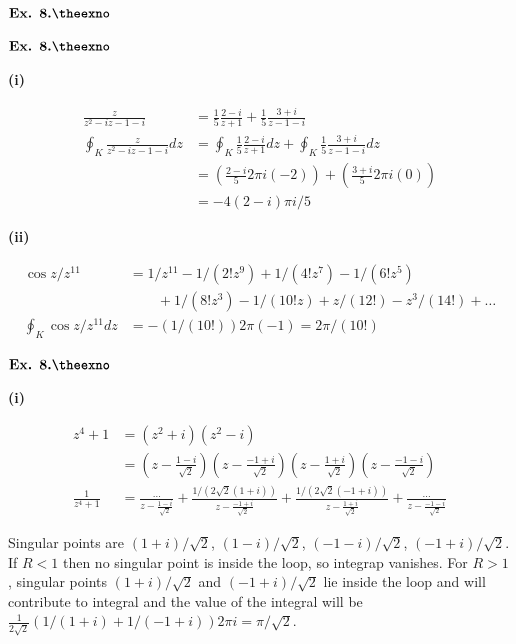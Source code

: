 \documentclass{article}
\def\tf{\textbf}
\newcounter{exno}
\begin{document}
${\textbf{Ex. 8.\theexno}}$\addtocounter{exno}{1}

\vspace{0.2in}

${\textbf{Ex. 8.\theexno}}$\addtocounter{exno}{1}
\tf{(i)} 

\begin{align*}
    \frac{z}{z^2-iz-1-i} &= \frac{1}{5}\frac{2-i}{z+1} + \frac{1}{5}\frac{3+i}{z-1-i}\\
    \oint_{K}\frac{z}{z^2-iz-1-i}dz &= \oint_{K}\frac{1}{5}\frac{2-i}{z+1}dz + \oint_{K}\frac{1}{5}\frac{3+i}{z-1-i}dz\\
    &= (\frac{2-i}{5} 2\pi i (-2)) + (\frac{3+i}{5}2\pi i  (0))\\
    &= -4(2-i)\pi i/5
\end{align*}

\tf{(ii)}

\begin{align*}
    \cos z/z^{11} &= 1/z^{11} - 1/(2!z^{9}) + 1/(4!z^{7}) - 1/(6!z^{5})\\
    &\qquad + 1/(8!z^{3}) - 1/(10!z) + z/(12!) - z^{3}/(14!) + \ldots\\
    \oint_{K}\cos z/z^{11}dz &= -(1/(10!))2\pi (-1) = 2\pi /(10!)
\end{align*}

\vspace{0.2in}

${\textbf{Ex. 8.\theexno}}$\addtocounter{exno}{1}

\tf{(i)}

\begin{align*}
    z^4+1 &= (z^2+i)(z^2-i)\\
    &= (z-\frac{1-i}{\sqrt{2}})(z-\frac{-1+i}{\sqrt{2}})(z-\frac{1+i}{\sqrt{2}})(z-\frac{-1-i}{\sqrt{2}})\\
    \frac{1}{z^4+1} &= \frac{\ldots}{z-\frac{1-i}{\sqrt{2}}} + \frac{1/(2\sqrt{2}(1+i))}{z-\frac{-1+i}{\sqrt{2}}} + \frac{1/(2\sqrt{2}(-1+i))}{z-\frac{1+i}{\sqrt{2}}} + \frac{\ldots}{z-\frac{-1-i}{\sqrt{2}}}
\end{align*}

Singular points are $(1+i)/\sqrt{2}$, $(1-i)/\sqrt{2}$, $(-1-i)/\sqrt{2}$, $(-1+i)/\sqrt{2}$. If $R < 1$ then no singular point is inside the loop, so integrap vanishes. For $R > 1$, singular points $(1+i)/\sqrt{2}$ and $(-1+i)/\sqrt{2}$ lie inside the loop and will contribute to integral and the value of the integral will be $\frac{1}{2\sqrt{2}}(1/(1+i)+1/(-1+i))2\pi i = \pi/\sqrt{2}$.\\~\\
\end{document}
